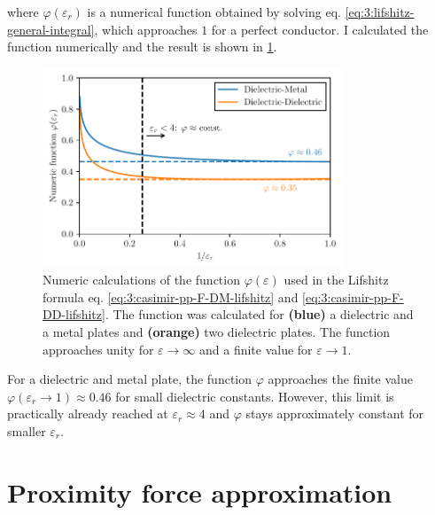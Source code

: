 where $\varphi(\varepsilon_r)$ is a numerical function obtained by solving eq. \eqref{eq:3:lifshitz-general-integral}, which approaches $1$ for a perfect conductor. I calculated the function numerically and the result is shown in \cref{fig:3:lifshitz-function}.
\begin{figure}[!htbp]
  \centering
  \includegraphics[width=0.8\textwidth]{./../figures/casimir-lifshitz-function.pdf}
  \caption{Numeric calculations of the function $\varphi(\varepsilon)$ used in the Lifshitz formula eq. \eqref{eq:3:casimir-pp-F-DM-lifshitz} and \eqref{eq:3:casimir-pp-F-DD-lifshitz}. The function was calculated for \textbf{(blue)} a dielectric and a metal plates and \textbf{(orange)} two dielectric plates. The function approaches unity for $\varepsilon\rightarrow\infty$ and a finite value for $\varepsilon\rightarrow 1$.}
  \label{fig:3:lifshitz-function}
\end{figure}
For a dielectric and metal plate, the function $\varphi$ approaches the finite value $\varphi(\varepsilon_r \rightarrow 1) \approx 0.46$ for small dielectric constants. However, this limit is practically already reached at $\varepsilon_r \approx 4$ and $\varphi$ stays approximately constant for smaller $\varepsilon_r$.



\section{Proximity force approximation}
\label{sec:3:pfa}

